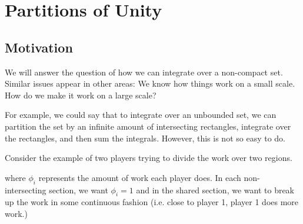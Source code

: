 \documentclass{article}
\numberwithin{equation}{section}
\begin{document}
\newpage
\section{Partitions of Unity}
\subsection{Motivation}
We will answer the question of how we can integrate over a non-compact set. Similar issues appear in other areas: We know how things work on a small scale. How do we make it work on a large scale?

For example, we could say that to integrate over an unbounded set, we can partition the set by an infinite amount of intersecting rectangles, integrate over the rectangles, and then sum the integrals. However, this is not so easy to do.

Consider the example of two players trying to divide the work over two regions.
\begin{center}
\end{center}
where $\phi_i$ represents the amount of work each player does. In each non-intersecting section, we want $\phi_i=1$ and in the shared section, we want to break up the work in some continuous fashion (i.e. close to player 1, player 1 does more work.)
\end{document}
